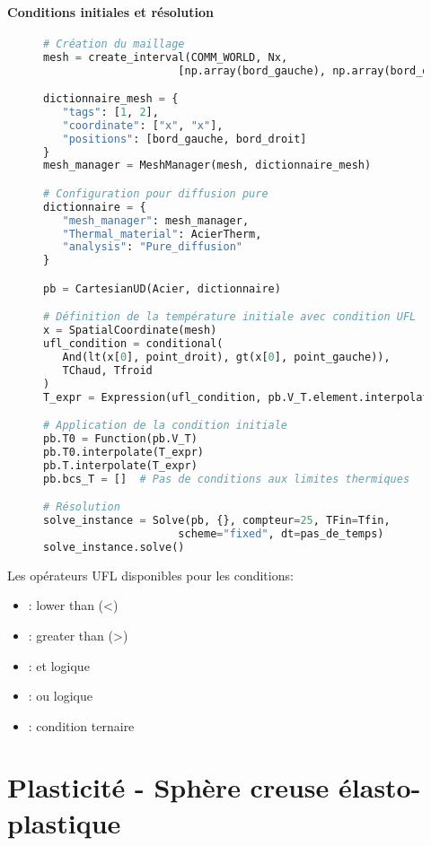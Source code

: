 \documentclass[10pt]{book}
\begin{document}
\paragraph{Conditions initiales et résolution}

\begin{figure}[h!]
\begin{lstlisting}[language=python]
# Création du maillage
mesh = create_interval(COMM_WORLD, Nx, 
                     [np.array(bord_gauche), np.array(bord_droit)])

dictionnaire_mesh = {
   "tags": [1, 2], 
   "coordinate": ["x", "x"], 
   "positions": [bord_gauche, bord_droit]
}
mesh_manager = MeshManager(mesh, dictionnaire_mesh)

# Configuration pour diffusion pure
dictionnaire = {
   "mesh_manager": mesh_manager,
   "Thermal_material": AcierTherm, 
   "analysis": "Pure_diffusion"
}

pb = CartesianUD(Acier, dictionnaire)

# Définition de la température initiale avec condition UFL
x = SpatialCoordinate(mesh)
ufl_condition = conditional(
   And(lt(x[0], point_droit), gt(x[0], point_gauche)), 
   TChaud, Tfroid
)
T_expr = Expression(ufl_condition, pb.V_T.element.interpolation_points())

# Application de la condition initiale
pb.T0 = Function(pb.V_T)
pb.T0.interpolate(T_expr)
pb.T.interpolate(T_expr)
pb.bcs_T = []  # Pas de conditions aux limites thermiques

# Résolution
solve_instance = Solve(pb, {}, compteur=25, TFin=Tfin, 
                     scheme="fixed", dt=pas_de_temps)
solve_instance.solve()
\end{lstlisting}
\end{figure}

Les opérateurs UFL disponibles pour les conditions:
\begin{itemize}
\item {}: lower than (<)
\item {}: greater than (>)
\item {}: et logique
\item {}: ou logique
\item {}: condition ternaire
\end{itemize}

\clearpage

\section{Plasticité - Sphère creuse élasto-plastique}\label{Section:Plasticité - Sphère creuse élasto-plastique}
\end{document}
